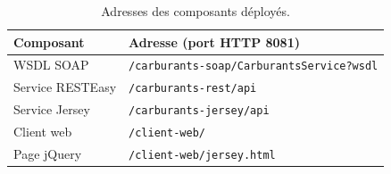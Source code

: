 \documentclass[11pt,a4paper]{article}
\newcommand{\code}[1]{\texttt{#1}}
\begin{document}
\begin{table}[H]
\centering
\small
\begin{tabular}{@{}ll@{}}
\toprule
\textbf{Composant} & \textbf{Adresse (port HTTP 8081)}\\
\midrule
WSDL SOAP & \code{/carburants-soap/CarburantsService?wsdl}\\
Service RESTEasy & \code{/carburants-rest/api}\\
Service Jersey & \code{/carburants-jersey/api}\\
Client web & \code{/client-web/}\\
Page jQuery & \code{/client-web/jersey.html}\\
\bottomrule
\end{tabular}
\caption{Adresses des composants déployés.}
\end{table}
\end{document}
